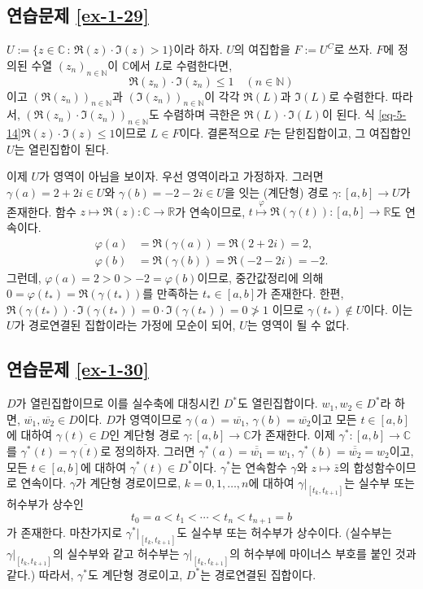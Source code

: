 \subsection*{연습문제 \ref{ex-1-29}}

$U:= \{ z\in\mathbb C\,:\, \Re(z)\cdot \Im(z) >1 \}$이라 하자.
$U$의 여집합을 $F:=U^C$로 쓰자.
$F$에 정의된 수열 $(z_n)_{n\in\mathbb N}$이 $\mathbb C$에서 $L$로 수렴한다면,
\begin{equation} \label{eq-5-14}
\Re(z_n)\cdot \Im(z_n) \le 1
\quad (n\in \mathbb N)
\end{equation}
이고 $(\Re(z_n))_{n\in\mathbb N}$과 
$(\Im(z_n))_{n\in\mathbb N}$이 각각 $\Re(L)$과 $\Im(L)$로 수렴한다.
따라서,  $(\Re(z_n)\cdot \Im(z_n))_{n\in\mathbb N}$도 수렴하며
극한은 $\Re(L)\cdot \Im(L)$이 된다.
식 \eqref{eq-5-14} $\Re(z)\cdot \Im(z) \le 1$이므로
$L\in F$이다.
결론적으로 $F$는 닫힌집합이고, 그 여집합인 $U$는 열린집합이 된다.

이제 $U$가 영역이 아님을 보이자.
우선 영역이라고 가정하자.
그러면 
$\gamma(a) = 2+2i\in U$와  $\gamma(b) = -2-2i\in U$을 잇는 
(계단형) 경로 $\gamma: [a,b] \to U$가 존재한다.
함수 $z\mapsto  \Re(z): \mathbb C \to \mathbb R$가 연속이므로,
$t\stackrel{\varphi}{\mapsto} \Re(\gamma(t)): [a,b] \to \mathbb R$도 연속이다.
\begin{align*}
\varphi(a) &= \Re(\gamma(a)) = \Re(2+2i) = 2,\\
\varphi(b) &= \Re(\gamma(b)) = \Re(-2-2i) = -2.
\end{align*}
그런데, $\varphi(a) = 2 >0>-2=\varphi(b)$이므로,
중간값정리에 의해 $0=\varphi(t_*) = \Re(\gamma(t_*))$를 만족하는
$t_*\in [a,b]$가 존재한다. 
한편, $\Re(\gamma(t_*))\cdot \Im(\gamma(t_*)) = 0 \cdot\Im(\gamma(t_*)) =0\not>1$
이므로 $\gamma(t_*) \not\in U$이다.
이는 $U$가 경로연결된 집합이라는 가정에 모순이 되어, $U$는 영역이 될 수 없다.

\subsection*{연습문제 \ref{ex-1-30}}

$D$가 열린집합이므로 이를 실수축에 대칭시킨 $D^*$도 열린집합이다.
$w_1, w_2 \in D^*$라 하면,
$\overline{w_1}, \overline{w_2} \in D$이다.
$D$가 영역이므로 
$\gamma(a) = \overline{w_1}$, $\gamma(b) = \overline{w_2}$이고
모든 $ t\in[a,b]$에 대하여 $\gamma(t)\in D$인
계단형 경로 $\gamma:[a,b] \to \mathbb C$가 존재한다.
이제 $\gamma^*:[a,b] \to \mathbb C$를 $\gamma^*(t) = \overline{\gamma(t)}$로
정의하자. 
그러면 $\gamma^*(a) = \overline{\overline{w_1}}=w_1$,
$\gamma^*(b) = \overline{\overline{w_2}}=w_2$이고,
모든 $t\in[a,b]$에 대하여 $\gamma^*(t)\in D^*$이다.
$\gamma^*$는 연속함수 $\gamma$와 $z\mapsto \bar z$의 합성함수이므로
연속이다.
$\gamma$가 계단형 경로이므로, 
$k=0,1,\ldots, n$에 대하여 $\gamma\big|_{[t_k, t_{k+1}]}$는
실수부 또는 허수부가 상수인
\[
t_0 =a <t_1 < \cdots < t_n  < t_{n+1} = b
\]
가 존재한다.
마찬가지로 $\gamma^*\big|_{[t_k, t_{k+1}]}$도 
실수부 또는 허수부가 상수이다.
(실수부는 $\gamma\big|_{[t_k, t_{k+1}]}$의 실수부와 같고
허수부는 $\gamma\big|_{[t_k, t_{k+1}]}$의 허수부에 마이너스 부호를 
붙인 것과 같다.)
따라서, $\gamma^*$도 계단형 경로이고,
$D^*$는 경로연결된 집합이다.

